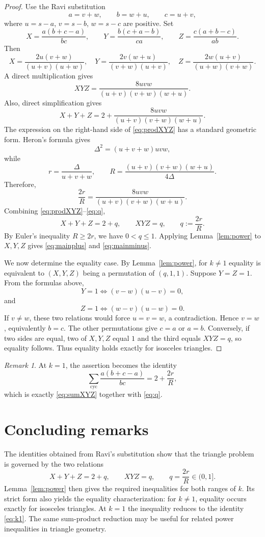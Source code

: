 \documentclass[11pt]{amsart}
\theoremstyle{remark}
\newtheorem{remark}[theorem]{Remark}
\newcommand{\cyc}{\sum_{\mathrm{cyc}}}
\begin{document}
\begin{proof}
Use the Ravi substitution
\[
 a=v+w,\qquad b=w+u,\qquad c=u+v,
\]
where $u=s-a$, $v=s-b$, $w=s-c$ are positive. Set
\[
 X=\frac{a(b+c-a)}{bc},\qquad
 Y=\frac{b(c+a-b)}{ca},\qquad
 Z=\frac{c(a+b-c)}{ab}.
\]
Then
\[
 X=\frac{2u(v+w)}{(u+v)(u+w)},\quad
 Y=\frac{2v(w+u)}{(v+w)(u+v)},\quad
 Z=\frac{2w(u+v)}{(u+w)(v+w)}.
\]
A direct multiplication gives
\begin{equation}\label{eq:prodXYZ}
 XYZ=\frac{8uvw}{(u+v)(v+w)(w+u)}.
\end{equation}
Also, direct simplification gives
\begin{equation}\label{eq:sumXYZ}
 X+Y+Z=2+\frac{8uvw}{(u+v)(v+w)(w+u)}.
\end{equation}
The expression on the right-hand side of \eqref{eq:prodXYZ} has a standard geometric form. Heron's formula gives
\[
 \Delta^2=(u+v+w)uvw,
\]
while
\[
 r=\frac{\Delta}{u+v+w},\qquad
 R=\frac{(u+v)(v+w)(w+u)}{4\Delta}.
\]
Therefore,
\begin{equation}\label{eq:q}
 \frac{2r}{R}=\frac{8uvw}{(u+v)(v+w)(w+u)}.
\end{equation}
Combining \eqref{eq:prodXYZ}--\eqref{eq:q},
\[
 X+Y+Z=2+q,\qquad XYZ=q,
 \qquad q:=\frac{2r}{R}.
\]
By Euler's inequality $R\ge2r$, we have $0<q\le1$. Applying Lemma~\ref{lem:power} to $X,Y,Z$ gives \eqref{eq:mainplus} and \eqref{eq:mainminus}.

We now determine the equality case. By Lemma~\ref{lem:power}, for $k\ne1$ equality is equivalent to $(X,Y,Z)$ being a permutation of $(q,1,1)$. Suppose $Y=Z=1$. From the formulas above,
\[
 Y=1\iff (v-w)(u-v)=0,
\]
and
\[
 Z=1\iff (w-v)(u-w)=0.
\]
If $v\ne w$, these two relations would force $u=v=w$, a contradiction. Hence $v=w$, equivalently $b=c$. The other permutations give $c=a$ or $a=b$. Conversely, if two sides are equal, two of $X,Y,Z$ equal $1$ and the third equals $XYZ=q$, so equality follows. Thus equality holds exactly for isosceles triangles.
\end{proof}

\begin{remark}
At $k=1$, the assertion becomes the identity
\[
 \cyc \frac{a(b+c-a)}{bc}=2+\frac{2r}{R},
\]
which is exactly \eqref{eq:sumXYZ} together with \eqref{eq:q}.
\end{remark}

\section{Concluding remarks}
The identities obtained from Ravi's substitution show that the triangle problem is governed by the two relations
\[
 X+Y+Z=2+q,\qquad XYZ=q,\qquad q=\frac{2r}{R}\in(0,1].
\]
Lemma~\ref{lem:power} then gives the required inequalities for both ranges of $k$. Its strict form also yields the equality characterization: for $k\ne1$, equality occurs exactly for isosceles triangles. At $k=1$ the inequality reduces to the identity \eqref{eq:k1}. The same sum-product reduction may be useful for related power inequalities in triangle geometry.
\end{document}

